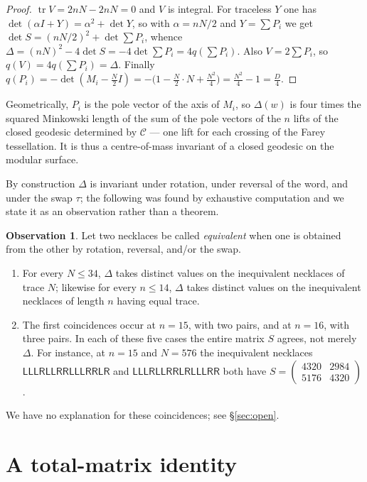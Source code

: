 \documentclass[11pt,reqno]{amsart}
\theoremstyle{plain}
\theoremstyle{definition}
\newtheorem{observation}[theorem]{Observation}
\newcommand{\Ll}{\mathsf{L}}
\newcommand{\Rr}{\mathsf{R}}
\newcommand{\tr}{\operatorname{tr}}
\newcommand{\sqm}[4]{\left(\begin{smallmatrix}#1&#2\\#3&#4\end{smallmatrix}\right)}
\begin{document}
\begin{proof}
$\tr V=2nN-2nN=0$ and $V$ is integral. For traceless $Y$ one has
$\det(\alpha I+Y)=\alpha^2+\det Y$, so with $\alpha=nN/2$ and $Y=\sum P_i$ we get
$\det S=(nN/2)^2+\det\sum P_i$, whence
$\Delta=(nN)^2-4\det S=-4\det\sum P_i=4q(\sum P_i)$. Also $V=2\sum P_i$, so
$q(V)=4q(\sum P_i)=\Delta$. Finally
$q(P_i)=-\det(M_i-\tfrac N2 I)=-\bigl(1-\tfrac{N}{2}\cdot N+\tfrac{N^2}{4}\bigr)
=\tfrac{N^2}{4}-1=\tfrac D4$.
\end{proof}

Geometrically, $P_i$ is the pole vector of the axis of $M_i$, so $\Delta(w)$ is four
times the squared Minkowski length of the sum of the pole vectors of the $n$ lifts of
the closed geodesic determined by $\mathcal{C}$ --- one lift for each crossing of the
Farey tessellation. It is thus a centre-of-mass invariant of a closed geodesic on the
modular surface.

By construction $\Delta$ is invariant under rotation, under reversal of the word, and
under the swap $\tau$; the following was found by exhaustive computation and we state it
as an observation rather than a theorem.

\begin{observation}\label{obs:sep}
Let two necklaces be called \emph{equivalent} when one is obtained from the other by
rotation, reversal, and/or the swap.
\begin{enumerate}
\item[(a)] For every $N\le34$, $\Delta$ takes distinct values on the inequivalent
necklaces of trace $N$; likewise for every $n\le14$, $\Delta$ takes distinct values on
the inequivalent necklaces of length $n$ having equal trace.
\item[(b)] The first coincidences occur at $n=15$, with two pairs, and at $n=16$, with
three pairs. In each of these five cases the entire matrix $S$ agrees, not merely
$\Delta$. For instance, at $n=15$ and $N=576$ the inequivalent necklaces
$\Ll\Ll\Ll\Rr\Ll\Ll\Rr\Rr\Ll\Ll\Ll\Rr\Rr\Ll\Rr$ and
$\Ll\Ll\Ll\Rr\Ll\Ll\Rr\Rr\Ll\Rr\Ll\Ll\Ll\Rr\Rr$ both have
$S=\sqm{4320}{2984}{5176}{4320}$.
\end{enumerate}
\end{observation}

We have no explanation for these coincidences; see \S\ref{sec:open}.

\section{A total-matrix identity}\label{sec:total}
\end{document}
